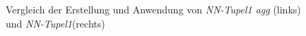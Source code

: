 \documentclass[
	twoside,
	12pt,
	a4paper,
	BCOR10mm,
	DIV14,
	listof=totoc,
	bibliography=totoc,
	headsepline
]{scrreprt}
\begin{document}
	\begin{figure}
		\centering
		\caption{Vergleich der Erstellung und Anwendung von \textit{NN-Tupel1 agg} (links) und \textit{NN-Tupel1}(rechts)}
		\label{fig:tupel1vstupel1agg}
	\end{figure} 
\end{document}
